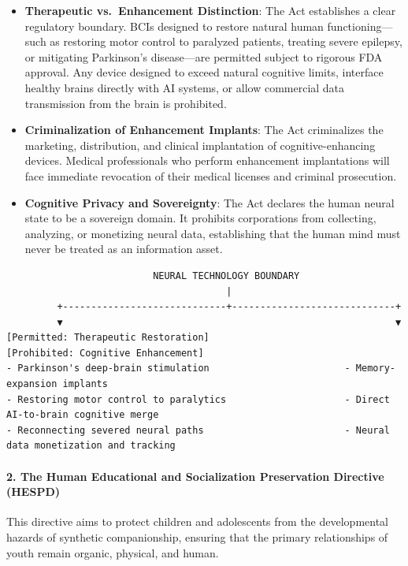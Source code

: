 \begin{itemize}
\tightlist
\item
  \textbf{Therapeutic vs.~Enhancement Distinction}: The Act establishes
  a clear regulatory boundary. BCIs designed to restore natural human
  functioning---such as restoring motor control to paralyzed patients,
  treating severe epilepsy, or mitigating Parkinson's disease---are
  permitted subject to rigorous FDA approval. Any device designed to
  exceed natural cognitive limits, interface healthy brains directly
  with AI systems, or allow commercial data transmission from the brain
  is prohibited.
\item
  \textbf{Criminalization of Enhancement Implants}: The Act criminalizes
  the marketing, distribution, and clinical implantation of
  cognitive-enhancing devices. Medical professionals who perform
  enhancement implantations will face immediate revocation of their
  medical licenses and criminal prosecution.
\item
  \textbf{Cognitive Privacy and Sovereignty}: The Act declares the human
  neural state to be a sovereign domain. It prohibits corporations from
  collecting, analyzing, or monetizing neural data, establishing that
  the human mind must never be treated as an information asset.
\end{itemize}

\begin{verbatim}
                          NEURAL TECHNOLOGY BOUNDARY
                                       |
         +-----------------------------+-----------------------------+
         ▼                                                           ▼
[Permitted: Therapeutic Restoration]                        [Prohibited: Cognitive Enhancement]
- Parkinson's deep-brain stimulation                        - Memory-expansion implants
- Restoring motor control to paralytics                     - Direct AI-to-brain cognitive merge
- Reconnecting severed neural paths                         - Neural data monetization and tracking
\end{verbatim}

\paragraph{2. The Human Educational and Socialization Preservation
Directive
(HESPD)}\label{the-human-educational-and-socialization-preservation-directive-hespd}

This directive aims to protect children and adolescents from the
developmental hazards of synthetic companionship, ensuring that the
primary relationships of youth remain organic, physical, and human.

